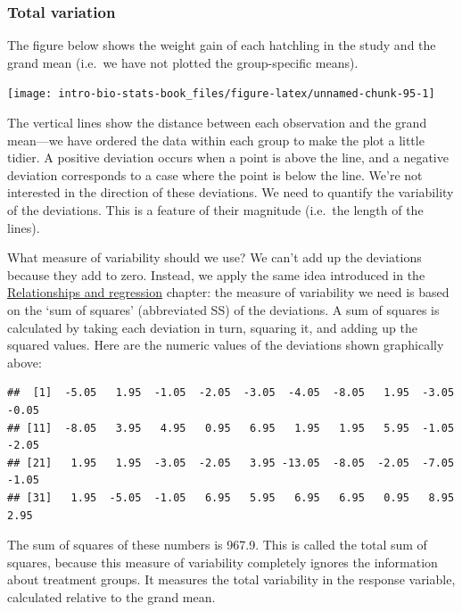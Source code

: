 \documentclass[
]{book}
\begin{document}
\hypertarget{total-variation-1}{%
\subsubsection*{Total variation}\label{total-variation-1}}

The figure below shows the weight gain of each hatchling in the study and the grand mean (i.e.~we have not plotted the group-specific means).

\begin{center}\texttt{[image: intro-bio-stats-book\_files/figure-latex/unnamed-chunk-95-1]} \end{center}

The vertical lines show the distance between each observation and the grand mean---we have ordered the data within each group to make the plot a little tidier. A positive deviation occurs when a point is above the line, and a negative deviation corresponds to a case where the point is below the line. We're not interested in the direction of these deviations. We need to quantify the variability of the deviations. This is a feature of their magnitude (i.e.~the length of the lines).

What measure of variability should we use? We can't add up the deviations because they add to zero. Instead, we apply the same idea introduced in the \protect\hyperlink{relationships-and-regression}{Relationships and regression} chapter: the measure of variability we need is based on the `sum of squares' (abbreviated SS) of the deviations. A sum of squares is calculated by taking each deviation in turn, squaring it, and adding up the squared values. Here are the numeric values of the deviations shown graphically above:

\begin{verbatim}
##  [1]  -5.05   1.95  -1.05  -2.05  -3.05  -4.05  -8.05   1.95  -3.05  -0.05
## [11]  -8.05   3.95   4.95   0.95   6.95   1.95   1.95   5.95  -1.05  -2.05
## [21]   1.95   1.95  -3.05  -2.05   3.95 -13.05  -8.05  -2.05  -7.05  -1.05
## [31]   1.95  -5.05  -1.05   6.95   5.95   6.95   6.95   0.95   8.95   2.95
\end{verbatim}

The sum of squares of these numbers is 967.9. This is called the total sum of squares, because this measure of variability completely ignores the information about treatment groups. It measures the total variability in the response variable, calculated relative to the grand mean.
\end{document}
